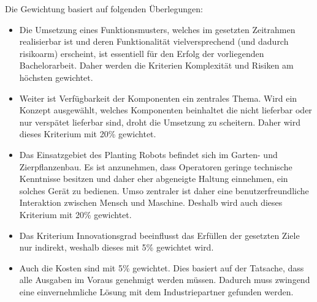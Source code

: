Die Gewichtung basiert auf folgenden Überlegungen:
\begin{itemize}
	\item Die Umsetzung eines Funktionsmusters, welches im gesetzten Zeitrahmen realisierbar ist und deren Funktionalität vielversprechend (und dadurch risikoarm) erscheint, ist essentiell für den Erfolg der vorliegenden Bachelorarbeit. Daher werden die Kriterien Komplexität und Risiken am höchsten gewichtet.
	
	\item Weiter ist Verfügbarkeit der Komponenten ein zentrales Thema. Wird ein Konzept ausgewählt, welches Komponenten beinhaltet die nicht lieferbar oder nur verspätet lieferbar sind, droht die Umsetzung zu scheitern. Daher wird dieses Kriterium mit 20\% gewichtet.
	
	\item Das Einsatzgebiet des Planting Robots befindet sich im Garten- und Zierpflanzenbau. Es ist anzunehmen, dass Operatoren geringe technische Kenntnisse besitzen und daher eher abgeneigte Haltung einnehmen, ein solches Gerät zu bedienen. Umso zentraler ist daher eine benutzerfreundliche Interaktion zwischen Mensch und Maschine. Deshalb wird auch dieses Kriterium mit 20\% gewichtet.
	
	\item Das Kriterium Innovationsgrad beeinflusst das Erfüllen der gesetzten Ziele nur indirekt, weshalb dieses mit 5\% gewichtet wird. 
	
	\item Auch die Kosten sind mit 5\% gewichtet. Dies basiert auf der Tatsache, dass alle Ausgaben im Voraus genehmigt werden müssen. Dadurch muss zwingend eine einvernehmliche Lösung mit dem Industriepartner gefunden werden.
\end{itemize}

